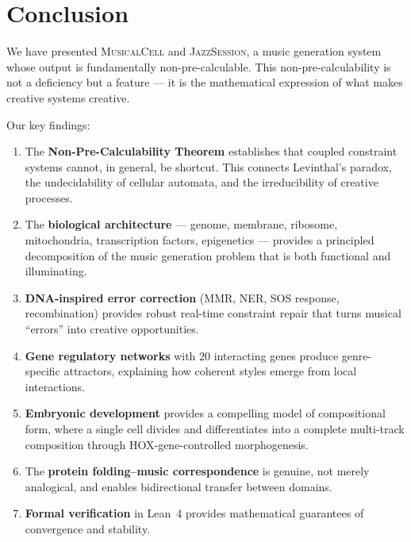 \documentclass[11pt,a4paper]{article}
\newcommand{\MusicalCell}{\textsc{MusicalCell}}
\newcommand{\JazzSession}{\textsc{JazzSession}}
\begin{document}
\section{Conclusion}\label{sec:conclusion}

We have presented \MusicalCell{} and \JazzSession{}, a music generation system whose output is fundamentally non-pre-calculable. This non-pre-calculability is not a deficiency but a feature --- it is the mathematical expression of what makes creative systems creative.

Our key findings:

\begin{enumerate}
  \item The \textbf{Non-Pre-Calculability Theorem} establishes that coupled constraint systems cannot, in general, be shortcut. This connects Levinthal's paradox, the undecidability of cellular automata, and the irreducibility of creative processes.

  \item The \textbf{biological architecture} --- genome, membrane, ribosome, mitochondria, transcription factors, epigenetics --- provides a principled decomposition of the music generation problem that is both functional and illuminating.

  \item \textbf{DNA-inspired error correction} (MMR, NER, SOS response, recombination) provides robust real-time constraint repair that turns musical ``errors'' into creative opportunities.

  \item \textbf{Gene regulatory networks} with 20 interacting genes produce genre-specific attractors, explaining how coherent styles emerge from local interactions.

  \item \textbf{Embryonic development} provides a compelling model of compositional form, where a single cell divides and differentiates into a complete multi-track composition through HOX-gene-controlled morphogenesis.

  \item The \textbf{protein folding--music correspondence} is genuine, not merely analogical, and enables bidirectional transfer between domains.

  \item \textbf{Formal verification} in Lean~4 provides mathematical guarantees of convergence and stability.
\end{enumerate}
\end{document}
